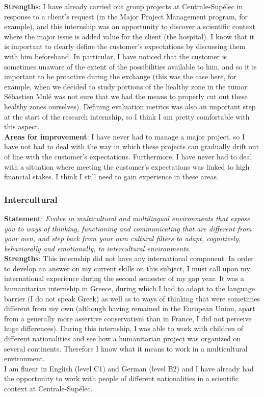 \documentclass[preprint,12pt]{elsarticle}
\begin{document}
\noindent \textbf{Strengths}: I have already carried out group projects at Centrale-Supélec in response to a client's request (in the Major Project Management program, for example), and this internship was an opportunity to discover a scientific context where the major issue is added value for the client (the hospital). I know that it is important to clearly define the customer's expectations by discussing them with him beforehand. In particular, I have noticed that the customer is sometimes unaware of the extent of the possibilities available to him, and so it is important to be proactive during the exchange (this was the case here, for example, when we decided to study portions of the healthy zone in the tumor: Sébastien Mulé was not sure that we had the means to properly cut out these healthy zones ourselves). Defining evaluation metrics was also an important step at the start of the research internship, so I think I am pretty comfortable with this aspect.\\[3 pt]

\noindent \textbf{Areas for improvement}: I have never had to manage a major project, so I have not had to deal with the way in which these projects can gradually drift out of line with the customer's expectations. Furthermore, I have never had to deal with a situation where meeting the customer's expectations was linked to high financial stakes. I think I still need to gain experience in these areas.

\subsubsection{Intercultural}

\noindent \textbf{Statement}: \textit{ Evolve in multicultural and multilingual environments that expose you to ways of thinking, functioning and communicating that are different from your own, and step back from your own cultural filters to adapt, cognitively, behaviorally and emotionally, to intercultural environments.}\\[3 pt]

\noindent \textbf{Strengths}: This internship did not have any international component. In order to develop an answer on my current skills on this subject, I must call upon my international experience during the second semester of my gap year. It was a humanitarian internship in Greece, during which I had to adapt to the language barrier (I do not speak Greek) as well as to ways of thinking that were sometimes different from my own (although having remained in the European Union, apart from a generally more assertive conservatism than in France, I did not perceive huge differences). During this internship, I was able to work with children of different nationalities and see how a humanitarian project was organized on several continents. Therefore I know what it means to work in a multicultural environment.\\
\indent I am fluent in English (level C1) and German (level B2) and I have already had the opportunity to work with people of different nationalities in a scientific context at Centrale-Supélec.\\[3 pt] 
\end{document}
